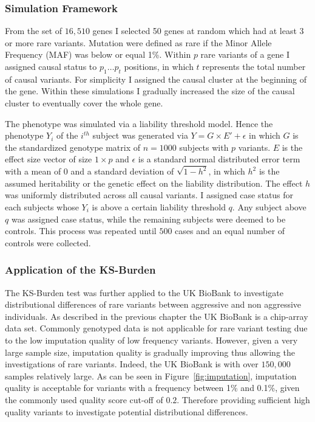 \subsubsection{Simulation Framework}
\label{ssub:Simulation_Framework}

From the set of $16,510$ genes I selected 50 genes at random which had at least 3 or more rare variants. 
Mutation were defined as rare if the Minor Allele Frequency (MAF) was below or equal 1\%. 
Within $p$ rare variants of a gene I assigned causal status to $p_1 \ldots p_t$ positions, in which $t$ represents the total number of causal variants.
For simplicity I assigned the causal cluster at the beginning of the gene.
Within these simulations I gradually increased the size of the causal cluster to eventually cover the whole gene. 

The phenotype was simulated via a liability threshold model.
Hence the phenotype $Y_i$ of the $i^{th}$ subject was generated via
$Y = G\times E' + \epsilon$
in which $G$ is the standardized genotype matrix of $n=1000$ subjects with $p$ variants.
$E$ is the effect size vector of size $1\times p$ and $\epsilon$ is a standard normal distributed error term with a mean of $0$ and a standard deviation of $\sqrt{1-h^2}$, in which $h^2$ is the assumed heritability or the genetic effect on the liability distribution.
The effect $h$ was uniformly distributed across all causal variants.
I assigned case status for each subjects whose $Y_i$ is above a certain liability threshold $q$.
Any subject above $q$ was assigned case status, while the remaining subjects were deemed to be controls.
This process was repeated until $500$ cases and an equal number of controls were collected.

\subsubsection{Application of the KS-Burden}
\label{ssub:Application_of_the_KS-Burden}

The KS-Burden test was further applied to the UK BioBank to investigate distributional differences of rare variants between aggressive and non aggressive individuals.
As described in the previous chapter the UK BioBank is a chip-array data set.
Commonly genotyped data is not applicable for rare variant testing due to the low imputation quality of low frequency variants.
However, given a very large sample size, imputation quality is gradually improving thus allowing the investigations of rare variants.
Indeed, the UK BioBank is with over $150,000$ samples relatively large.
As can be seen in Figure~\ref{fig:imputation}, imputation quality is acceptable for variants with a frequency between 1\% and 0.1\%, given the commonly used quality score cut-off of $0.2$.
Therefore providing sufficient high quality variants to investigate potential distributional differences.

